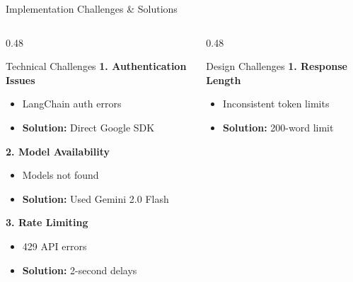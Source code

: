 \documentclass[aspectratio=169]{beamer}
\begin{document}
\begin{frame}{Implementation Challenges \& Solutions}
    \begin{columns}
        \begin{column}{0.48\textwidth}
            \begin{block}{Technical Challenges}
                \small
                \textbf{1. Authentication Issues}
                \begin{itemize}
                    \footnotesize
                    \item LangChain auth errors
                    \item \textbf{Solution:} Direct Google SDK
                \end{itemize}
                
                \vspace{0.1cm}
                
                \textbf{2. Model Availability}
                \begin{itemize}
                    \footnotesize
                    \item Models not found
                    \item \textbf{Solution:} Used Gemini 2.0 Flash
                \end{itemize}
                
                \vspace{0.1cm}
                
                \textbf{3. Rate Limiting}
                \begin{itemize}
                    \footnotesize
                    \item 429 API errors
                    \item \textbf{Solution:} 2-second delays
                \end{itemize}
            \end{block}
        \end{column}
        
        \begin{column}{0.48\textwidth}
            \begin{block}{Design Challenges}
                \small
                \textbf{1. Response Length}
                \begin{itemize}
                    \footnotesize
                    \item Inconsistent token limits
                    \item \textbf{Solution:} 200-word limit
                \end{itemize}
                

\end{block}
\end{column}
\end{columns}
\end{frame}
\end{document}
